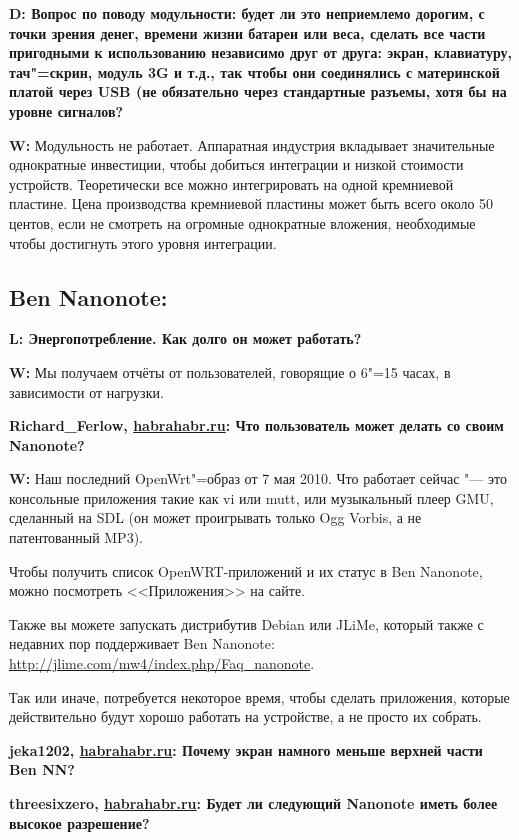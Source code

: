 \documentclass[10pt, a5paper]{article}
\begin{document}
{\noindent \bf D: Вопрос по поводу модульности: будет ли это неприемлемо дорогим, с точки зрения денег, времени жизни батареи или веса, сделать все части пригодными к использованию независимо друг от друга: экран, клавиатуру, тач"=скрин, модуль 3G и т.д., так чтобы они соединялись с материнской платой через USB (не обязательно через стандартные разъемы, хотя бы на уровне сигналов?}

{\noindent \bf W:} Модульность не работает. Аппаратная индустрия вкладывает значительные однократные инвестиции, чтобы добиться интеграции
и низкой стоимости устройств. Теоретически все можно интегрировать на одной кремниевой пластине.
Цена производства кремниевой пластины может быть всего около 50 центов, если не смотреть на огромные однократные вложения, необходимые чтобы достигнуть этого уровня интеграции. 

\subsection*{Ben Nanonote:}

{\noindent \bf L: Энергопотребление. Как долго он может работать?}

{\noindent \bf W:} Мы получаем отчёты от пользователей, говорящие о 6"=15 часах, в зависимости от нагрузки.

{\noindent \bf Richard\_Ferlow, \url{habrahabr.ru}: Что пользователь может делать со своим Nanonote?}

{\noindent \bf W:} Наш последний OpenWrt"=образ от 7 мая 2010. Что работает сейчас "--- это консольные приложения такие как vi или mutt, или музыкальный плеер GMU, сделанный на SDL (он может проигрывать только Ogg Vorbis, а не патентованный MP3).

Чтобы получить список OpenWRT-приложений и их статус в Ben Nanonote, можно посмотреть <<Приложения>> на сайте.

Также вы можете запускать дистрибутив Debian или JLiMe, который также с недавних пор поддерживает Ben Nanonote: \url{http://jlime.com/mw4/index.php/Faq_nanonote}.

Так или иначе, потребуется некоторое время, чтобы сделать приложения, которые действительно будут хорошо работать на устройстве, а не просто их собрать.

{\noindent \bf jeka1202, \url{habrahabr.ru}: Почему экран намного меньше верхней части Ben NN?}

{\noindent \bf threesixzero, \url{habrahabr.ru}: Будет ли следующий Nanonote иметь более высокое разрешение?}
\end{document}
